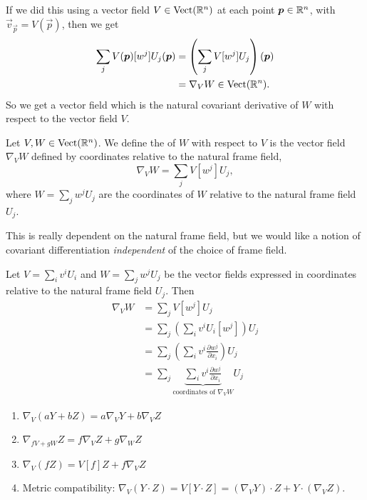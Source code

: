 If we did this using a vector field $V\in\operatorname{Vect}(\mathbb{R}^{n})$ at each point
$\boldsymbol{p}\in\mathbb{R}^{n}$, with $\vec{v}_{\vec{p}}=V(\vec{p})$, then we get
\begin{equation}
\begin{split}
  \sum_{j}V(\boldsymbol{p})[w^{j}]U_{j}(\boldsymbol{p})&=\left(\sum_{j}V[w^{j}]U_{j}\right)(\boldsymbol{p})\\
&=\nabla_{V}W\in\operatorname{Vect}(\mathbb{R}^{n}).
\end{split}
\end{equation}
So we get a vector field which is the natural covariant derivative of
$W$ with respect to the vector field $V$. 

\begin{definition}
Let $V,W\in\operatorname{Vect}(\mathbb{R}^{n})$. We define the 
of $W$ with respect to $V$ is the vector field $\nabla_{V}W$ defined by
coordinates relative to the natural frame field,
\begin{equation}
\nabla_{V}W = \sum_{j}V[w^{j}]U_{j},
\end{equation}
where $W=\sum_{j}w^{j}U_{j}$ are the coordinates of $W$ relative to the
natural frame field $U_{j}$.
\end{definition}

\begin{remark}
This is really dependent on the natural frame field, but we would like a
notion of covariant differentiation \emph{independent} of the choice of
frame field.
\end{remark}

\begin{example}
Let $V=\sum_{i}v^{i}U_{i}$ and $W=\sum_{j}w^{j}U_{j}$ be the vector
fields expressed in coordinates relative to the natural frame field
$U_{j}$. Then
\begin{subequations}
  \begin{align}
    \nabla_{V}W &= \sum_{j}V[w^{j}]U_{j}\\
    &= \sum_{j}\left(\sum_{i}v^{i}U_{i}[w^{j}]\right)U_{j}\\
    &= \sum_{j}\left(\sum_{i}v^{i}\frac{\partial w^{j}}{\partial x_{i}}\right)U_{j}\\
 &= \sum_{j}\underbrace{\sum_{i}v^{i}\frac{\partial w^{j}}{\partial
        x_{i}}}_{\text{coordinates of }\nabla_{V}W}U_{j}
  \end{align}
\end{subequations}
  \end{example}

\begin{theorem}
\begin{enumerate}
\item $\nabla_{V}(aY + bZ) = a\nabla_{V}Y + b\nabla_{V}Z$
\item $\nabla_{fV + gW}Z = f\nabla_{V}Z + g\nabla_{W}Z$
\item $\nabla_{V}(fZ) = V[f]Z + f\nabla_{V}Z$
\item Metric compatibility: $\nabla_{V}(Y\cdot Z) = V[Y\cdot Z] = (\nabla_{V}Y)\cdot Z + Y\cdot(\nabla_{V}Z)$.
\end{enumerate}
\end{theorem}

